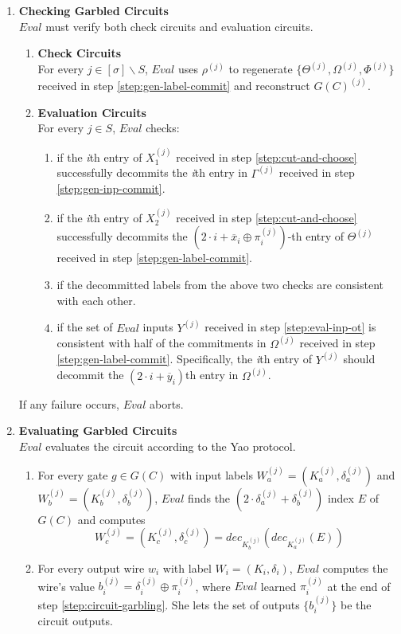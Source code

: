\documentclass{article}
\begin{document}
\begin{enumerate}
	\item \label{step:circuit-check} \textbf{Checking Garbled Circuits}\\
	$Eval$ must verify both check circuits and evaluation circuits.
	\begin{enumerate}[label=(\alph*)]
		\item \textbf{Check Circuits}\\
		For every $j \in [\sigma] \backslash S$, $Eval$ uses $\rho^{(j)}$ to regenerate $\{\Theta^{(j)}, \Omega^{(j)}, \Phi^{(j)} \}$ received in step \ref{step:gen-label-commit} and reconstruct $G(C)^{(j)}$.
		\item \textbf{Evaluation Circuits}\\
		For every $j \in S$, $Eval$ checks:
		\begin{enumerate}[label=\roman*]
			\item if the \emph{i}th entry of $X_{1}^{(j)}$ received in step \ref{step:cut-and-choose} successfully decommits the \emph{i}th entry in $\Gamma^{(j)}$ received in step \ref{step:gen-inp-commit}.
			\item if the \emph{i}th entry of $X_{2}^{(j)}$ received in step \ref{step:cut-and-choose} successfully decommits the $(2\cdot i + \overline{x}_{i} \oplus \pi_{i}^{(j)})$-th entry of $\Theta^{(j)}$ received in step \ref{step:gen-label-commit}.
			\item if the decommitted labels from the above two checks are consistent with each other.
			\item if the set of $Eval$ inputs $Y^{(j)}$ received in step \ref{step:eval-inp-ot} is consistent with half of the commitments in $\Omega^{(j)}$ received in step \ref{step:gen-label-commit}. Specifically, the \emph{i}th entry of $Y^{(j)}$ should decommit the $(2\cdot i + \overline{y}_{i})$th entry in $\Omega^{(j)}$.
		\end{enumerate}
	\end{enumerate}
	If any failure occurs, $Eval$ aborts.
	
	\item \label{step:circuit-evaluate} \textbf{Evaluating Garbled Circuits}\\
	$Eval$ evaluates the circuit according to the Yao protocol. 
	\begin{enumerate}[label=(\alph*)]
		\item For every gate $g \in G(C)$ with input labels $W_{a}^{(j)} = (K_{a}^{(j)}, \delta_{a}^{(j)})$ and $W_{b}^{(j)} = (K_{b}^{(j)}, \delta_{b}^{(j)})$, $Eval$ finds the $(2 \cdot \delta_{a}^{(j)} + \delta_{b}^{(j)})$ index $E$ of $G(C)$ and computes $$W_{c}^{(j)} = (K_{c}^{(j)}, \delta_{c}^{(j)}) = dec_{K_{b}^{(j)}}(dec_{K_{a}^{(j)}}(E))$$
		\item For every output wire $w_{i}$ with label $W_{i} = (K_{i},\delta_{i})$, $Eval$ computes the wire's value $b_{i}^{(j)} = \delta_{i}^{(j)} \oplus \pi_{i}^{(j)}$, where $Eval$ learned $\pi_{i}^{(j)}$ at the end of step \ref{step:circuit-garbling}. She lets the set of outputs $\{b_{i}^{(j)}\}$ be the circuit outputs.
	\end{enumerate}
	

\end{enumerate}
\end{document}
